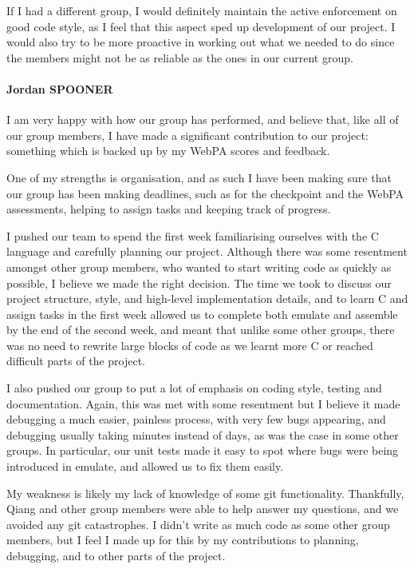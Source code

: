 \documentclass[10pt]{article}
\begin{document}
If I had a different group, I would definitely maintain the active enforcement on good code style, as I feel that this aspect sped up development of our project. I would also try to be more proactive in working out what we needed to do since the members might not be as reliable as the ones in our current group.

\paragraph{Jordan SPOONER}
I am very happy with how our group has performed, and believe that, like all of our group members, I have made a significant contribution to our project: something which is backed up by my WebPA scores and feedback.

One of my strengths is organisation, and as such I have been making sure that our group has been making deadlines, such as for the checkpoint and the WebPA assessments, helping to assign tasks and keeping track of progress.

I pushed our team to spend the first week familiarising ourselves with the C language and carefully planning our project. Although there was some resentment amongst other group members, who wanted to start writing code as quickly as possible, I believe we made the right decision. The time we took to discuss our project structure, style, and high-level implementation details, and to learn C and assign tasks in the first week allowed us to complete both emulate and assemble by the end of the second week, and meant that unlike some other groups, there was no need to rewrite large blocks of code as we learnt more C or reached difficult parts of the project.

I also pushed our group to put a lot of emphasis on coding style, testing and documentation. Again, this was met with some resentment but I believe it made debugging a much easier, painless process, with very few bugs appearing, and debugging usually taking minutes instead of days, as was the case in some other groups. In particular, our unit tests made it easy to spot where bugs were being introduced in emulate, and allowed us to fix them easily.

My weakness is likely my lack of knowledge of some git functionality. Thankfully, Qiang and other group members were able to help answer my questions, and we avoided any git catastrophes. I didn't write as much code as some other group members, but I feel I made up for this by my contributions to planning, debugging, and to other parts of the project.
\end{document}

